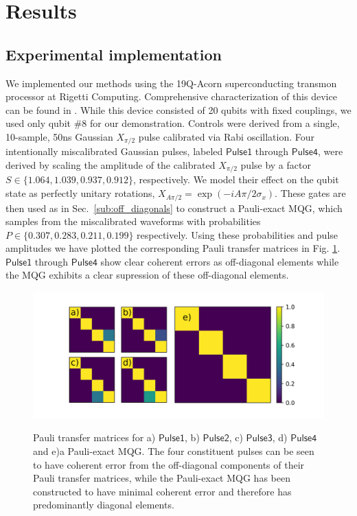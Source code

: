 \documentclass[aps,nofootinbib,pra,notitlepage,twocolumn]{revtex4-1}
\newcommand{\0}{\ensuremath{\mathbf{0}}}
\begin{document}
\section{Results} %
\label{sec:results}


\subsection{Experimental implementation } %
\label{sub:experimental}
\noindent We implemented our methods using the 19Q-Acorn superconducting transmon processor at Rigetti Computing. Comprehensive characterization of this device can be found in \cite{1712.05771}. While this device consisted of 20 qubits with fixed couplings, we used only qubit \#8 for our demonstration. Controls were derived from a single, 10-sample, 50ns Gaussian $X_{\pi/2}$ pulse calibrated via Rabi oscillation. Four intentionally miscalibrated Gaussian pulses, labeled $\mathsf{Pulse1}$ through $\mathsf{Pulse4}$, were derived by scaling the amplitude of the calibrated $X_{\pi/2}$ pulse by a factor $S \in \{1.064, 1.039,0.937, 0.912\}$, respectively. We model their effect on the qubit state as perfectly unitary rotations, $X_{A \pi/2} = \exp{(-i A \pi/2 \sigma_x)}$. These gates are then used as in Sec.~\ref{sub:off_diagonals} to construct a Pauli-exact MQG, which samples from the miscalibrated waveforms with probabilities $P\in \{0.307, 0.283, 0.211, 0.199\}$ respectively. Using these probabilities and pulse amplitudes we have plotted the corresponding Pauli transfer matrices in Fig. \ref{ptms}. $\mathsf{Pulse1}$ through $\mathsf{Pulse4}$ show clear coherent errors as off-diagonal elements while the MQG exhibits a clear supression of these off-diagonal elements.
\begin{figure}
\includegraphics[scale=.5]{experimental-ptm.png}
\label{ptms}
\caption{Pauli transfer matrices for a) $\mathsf{Pulse1}$, b) $\mathsf{Pulse2}$, c) $\mathsf{Pulse3}$, d) $\mathsf{Pulse4}$ and e)a Pauli-exact MQG. The four constituent pulses can be seen to have coherent error from the off-diagonal components of their Pauli transfer matrices, while the Pauli-exact MQG has been constructed to have minimal coherent error and therefore has predominantly diagonal elements.}   
\end{figure}
\end{document}
